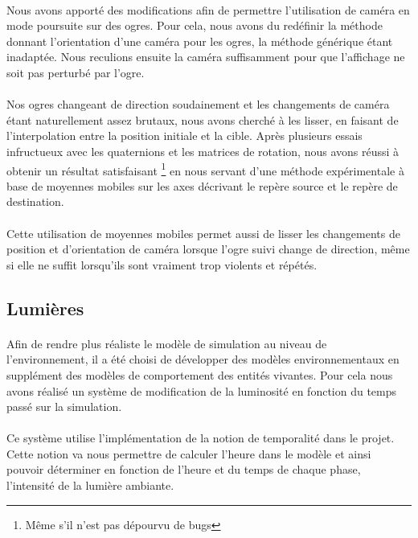 \paragraph{}
Nous avons apporté des modifications afin de permettre l'utilisation de caméra
en mode poursuite sur des ogres. Pour cela, nous avons du redéfinir la méthode
donnant l'orientation d'une caméra pour les ogres, la méthode générique étant
inadaptée. Nous reculions ensuite la caméra suffisamment pour que l'affichage ne
soit pas perturbé par l'ogre.

\paragraph{}
Nos ogres changeant de direction soudainement et les changements de caméra étant
naturellement assez brutaux, nous avons cherché à les lisser, en faisant de
l'interpolation entre la position initiale et la cible. Après plusieurs essais
infructueux avec les quaternions et les matrices de rotation, nous avons réussi
à obtenir un résultat satisfaisant \footnote{Même s'il n'est pas dépourvu de
bugs} en nous servant d'une méthode expérimentale à base de moyennes mobiles sur
les axes décrivant le repère source et le repère de destination.

\paragraph{}
Cette utilisation de moyennes mobiles permet aussi de lisser les changements de
position et d'orientation de caméra lorsque l'ogre suivi change de direction,
même si elle ne suffit lorsqu'ils sont vraiment trop violents et répétés.

\subsection{Lumières}
\paragraph{}
Afin de rendre plus réaliste le modèle de simulation au niveau de
l'environnement, il a été choisi de développer des modèles environnementaux en
supplément des modèles de comportement des entités vivantes. Pour cela nous
avons réalisé un système de modification de la luminosité en fonction du temps
passé sur la simulation.

\paragraph{}
Ce système utilise l'implémentation de la notion de temporalité dans le projet.
Cette notion va nous permettre de calculer l'heure dans le modèle et ainsi
pouvoir déterminer en fonction de l'heure et du temps de chaque phase,
l'intensité de la lumière ambiante.

